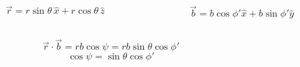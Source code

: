 \documentclass[10pt,aspectratio=169]{beamer}
\begin{document}
	\begin{frame}
		\begin{columns}
			\begin{figure}[!htb]
				\centering
				\includegraphics[scale=0.5]{r-components}
			\end{figure}
			\pause
			\[ \vec{r} = r \sin\theta\, \hat{x} + r \cos\theta\, \hat{z} \]
			\pause
			\begin{figure}[!htb]
				\centering
				\includegraphics[scale=0.5]{b-components}
			\end{figure}
		\pause
		\[ \vec{b} = b \cos\phi' \hat{x} + b \sin\phi' \hat{y} \]
		
		\end{columns}
	\pause
	\[ \vec{r}\cdot\vec{b} = rb\cos\psi = rb\sin\theta\cos\phi' \]
	\[ \cos\psi = \sin\theta\cos\phi' \]
	\end{frame}
\end{document}
